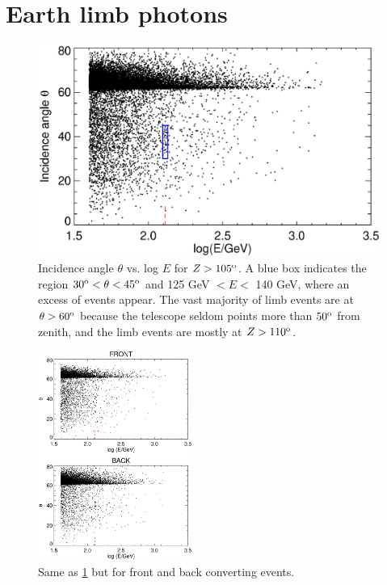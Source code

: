 \documentclass[aps,twocolumn,prd,superscriptaddress,showpacs,nofootinbib,fixfloat]{revtex4}
\newcommand{\degree}{^{\rm o}}
\begin{document}
\section{Earth limb photons}
\label{sec:EarthLimb}

\begin{figure}
  \centering
  \includegraphics[width=1.0\linewidth]{plots/theta-E.ps}
  \caption{Incidence angle $\theta$ vs. log $E$ for $Z > 105\degree$.  A blue
  box indicates the region $30\degree < \theta < 45\degree$ and 125 GeV $< E
  <$ 140 GeV, where an excess of events appear.  The vast majority of limb
  events are at $\theta > 60\degree$ because the telescope seldom points more
  than $50\degree$ from zenith, and the limb events are mostly at
  $Z>110\degree$.}
  \label{fig:theta-E}
\end{figure}

\begin{figure}
\centering
\includegraphics[width=0.45\textwidth]{plots/theta-E-frontback.ps}
\caption{Same as \ref{fig:theta-E} but for front and back converting events.}
\label{fig:theta-E-frontback}
\end{figure}
\end{document}

